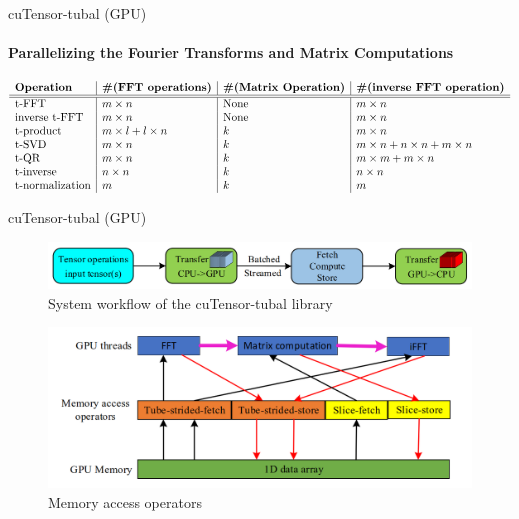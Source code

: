\documentclass[t, 10pt, handout, aspectratio=169]{beamer}
\begin{document}
\begin{frame}{cuTensor-tubal (GPU)}
\framesubtitle{Parallelizing the Fourier Transforms and Matrix Computations}

\begin{table}
$\begin{array}{l | l | l |l}
\textbf{Operation} & \textbf{\#(FFT operations)} & \textbf{\#(Matrix Operation)} & \textbf{\#(inverse FFT operation)}\\
\hline \hline
\text{t-FFT} & m \times n & \text{None} & m \times n \\
\text{inverse t-FFT} & m \times n & \text{None} & m \times n \\
\text{t-product} & m \times l + l\times n & k & m \times n \\
\text{t-SVD} & m \times n & k & m \times n + n\times n + m\times n \\
\text{t-QR} & m \times n & k & m \times m + m \times n \\
\text{t-inverse} & n \times n & k & n \times n \\
\text{t-normalization} & m & k & m 
\end{array}$
\caption{Seven tensor operations in the cuTensor-tubal library}
\end{table}
\end{frame}

\begin{frame}{cuTensor-tubal (GPU)}
\begin{figure}
	\centering  
	\includegraphics[width=0.9\linewidth]{figs/cutensor_workflow.png} \\
	System workflow of the cuTensor-tubal library
	\label{fig:cutensor_workflow}
\end{figure}
\begin{figure}
	\centering  
	\includegraphics[width=0.6\linewidth]{figs/cutensor_memoryaccess.png} \\
	Memory access operators
	\label{fig:cutensor_memoryaccess}
\end{figure}
\end{frame}
\end{document}
